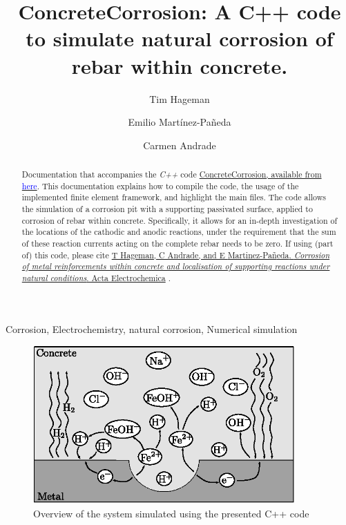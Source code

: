 \documentclass[3p]{elsarticle} %
\newcommand{\citeMe}{\href{https://doi.org/10.1016/j.electacta.2025.146203}{T Hageman, C Andrade, and E {Martinez-Pa{\~n}eda}. \textit{Corrosion of metal reinforcements within concrete and localisation of supporting reactions under natural conditions}. Acta Electrochemica} \citep{Hageman2025}}
\begin{document}
\begin{frontmatter}
\title{ConcreteCorrosion: A C++ code to simulate natural corrosion of rebar within concrete.}

\author[1]{Tim Hageman }
\author[1]{Emilio Martínez-Pañeda}
\author[2]{Carmen Andrade}



\address[1]{Department of Engineering Science, University of Oxford, Oxford OX1 3PJ, UK}
\address[2]{International Center of Numerical Methods in Engineering (CIMNE), Madrid 28010, Spain}

\begin{abstract}
Documentation that accompanies the \textit{C++} code \href{https://github.com/T-Hageman/ConcreteCorrosion}{ConcreteCorrosion, available from \textcolor{blue}{here}}. This documentation explains how to compile the code, the usage of the implemented finite element framework, and highlight the main files.  The code allows the simulation of a corrosion pit with a supporting passivated surface, applied to corrosion of rebar within concrete. Specifically, it allows for an in-depth investigation of the locations of the cathodic and anodic reactions, under the requirement that the sum of these reaction currents acting on the complete rebar needs to be zero. If using (part of) this code, please cite \citeMe{}.  
\end{abstract}

\begin{keyword}
Corrosion, Electrochemistry, natural corrosion, Numerical simulation
\end{keyword}

\end{frontmatter}

\begin{figure}
	\centering
	\includegraphics[width=10cm]{Fig1.eps}
	\caption{Overview of the system simulated using the presented C++ code}
\end{figure}
\end{document}
